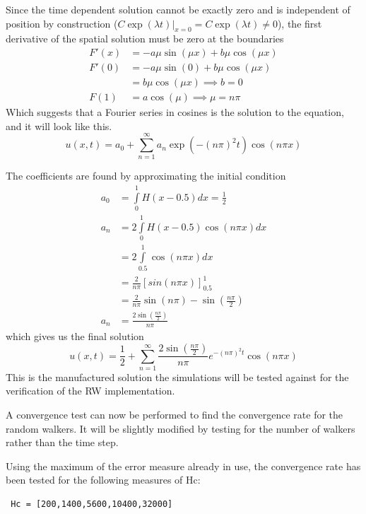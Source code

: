 Since the time dependent solution cannot be exactly zero and is independent of position by construction ($C\exp(\lambda t)|_{x=0} = C\exp(\lambda t) \neq 0$), the first derivative of the spatial solution must be zero at the boundaries
\begin{align*}
 F'(x) &= -a\mu\sin(\mu x) + b\mu\cos(\mu x) \\
 F'(0) &= -a \mu\sin(0) + b\mu\cos(\mu x) \\
 &= b\mu\cos(\mu x) \implies b=0 \\
 F(1) &= a\cos(\mu) \implies \mu = n\pi
\end{align*}
Which suggests that a Fourier series in cosines is the solution to the equation, and it will look like this.
\begin{equation}
 u(x,t) = a_0 + \sum\limits_{n=1}^\infty a_n\exp\left(-(n\pi)^2t\right)\cos(n\pi x)
\end{equation}

The coefficients are found by approximating the initial condition
\begin{align*}
 a_0 &= \int\limits_0^1H(x-0.5)dx = \frac{1}{2} \\
 a_n &= 2\int\limits_0^1H(x-0.5)\cos(n\pi x)dx \\
 &= 2\int\limits_{0.5}^1\cos(n\pi x)dx \\
 &= \frac{2}{n\pi}\left[sin(n\pi x)\right]_{0.5}^1 \\
 &= \frac{2}{n\pi}\sin(n\pi) - \sin(\frac{n\pi}{2}) \\
 a_n &= \frac{2\sin(\frac{n\pi}{2})}{n\pi}
\end{align*}
which gives us the final solution
\begin{equation}
 u(x,t) = \frac{1}{2} + \sum\limits_{n=1}^\infty \frac{2\sin(\frac{n\pi}{2})}{n\pi}e^{-(n\pi)^2t}\cos(n\pi x)
\end{equation}
This is the manufactured solution the simulations will be tested against for the verification of the RW implementation.


A convergence test can now be performed to find the convergence rate for the random walkers.
It will be slightly modified by testing for the number of walkers rather than the time step. 


Using the maximum of the error measure already in use, the convergence rate has been tested for the following measures of Hc:
\begin{lstlisting}
 Hc = [200,1400,5600,10400,32000]
\end{lstlisting}

